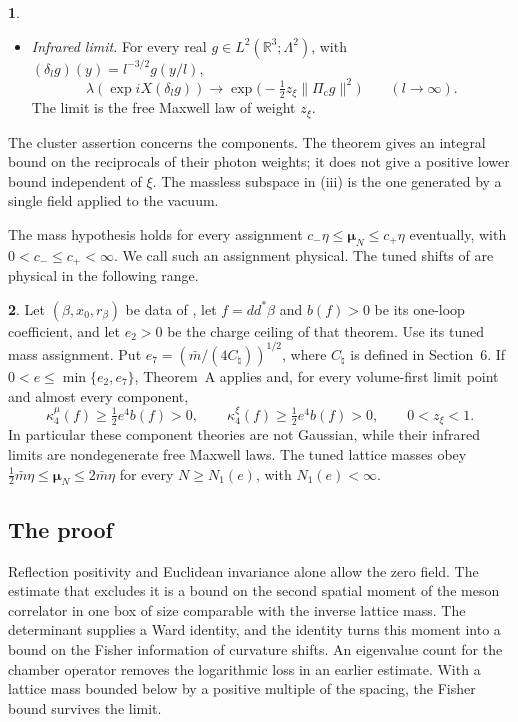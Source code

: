 \documentclass[11pt]{amsart}
\newcommand{\namedhead}{}
\theoremstyle{definition}
\newtheorem*{namedinner}{\namedhead}
\newenvironment{named}[1]{\renewcommand{\namedhead}{#1}\begin{namedinner}}{\end{namedinner}}
\begin{document}
\begin{named}{Theorem A}
\begin{itemize}
\item[(iv)] \emph{Infrared limit.}
For every real $g\in L^2(\mathbb R^3;\Lambda^2)$, with
$(\delta_lg)(y)=l^{-3/2}g(y/l)$,
\[
\lambda(\exp iX(\delta_lg))\longrightarrow
\exp\bigl(-\tfrac12z_\xi\|\Pi_{\mathrm c}g\|^2\bigr)
\qquad(l\to\infty).
\]
The limit is the free Maxwell law of weight $z_\xi$.
\end{itemize}
\end{named}

The cluster assertion concerns the components. The theorem gives an
integral bound on the reciprocals of their photon weights; it does not give a positive
lower bound independent of $\xi$. The massless subspace in (iii) is
the one generated by a single field applied to the vacuum.

The mass hypothesis holds for every assignment
$c_-\eta\le\boldsymbol\mu_N\le c_+\eta$ eventually, with
$0<c_-\le c_+<\infty$. We call such an assignment physical.
The tuned shifts of \cite{QEDIII} are physical in the following range.

\begin{named}{Corollary B}
Let $(\beta,x_0,r_\beta)$ be data of \cite[Theorem~44]{QEDIII},
let $f=dd^*\beta$ and $b(f)>0$ be its one-loop coefficient, and let
$e_2>0$ be the charge ceiling of that theorem. Use its tuned mass
assignment. Put
$e_7=(\bar m/(4C_\natural))^{1/2}$, where $C_\natural$ is defined in
Section~6. If $0<e\le\min\{e_2,e_7\}$, Theorem~A applies and, for
every volume-first limit point and almost every component,
\[
\kappa_4^\mu(f)\ge\tfrac12e^4b(f)>0,
\qquad \kappa_4^\xi(f)\ge\tfrac12e^4b(f)>0,
\qquad 0<z_\xi<1.
\]
In particular these component theories are not Gaussian, while their
infrared limits are nondegenerate free Maxwell laws. The tuned lattice
masses obey
$\frac12\bar m\eta\le\boldsymbol\mu_N\le2\bar m\eta$
for every $N\ge N_1(e)$, with $N_1(e)<\infty$.
\end{named}

\subsection*{The proof}
Reflection positivity and Euclidean invariance alone allow the zero
field. The estimate that excludes it is a bound on the second spatial
moment of the meson correlator in one box of size comparable with the
inverse lattice mass. The determinant supplies a Ward identity, and the
identity turns this moment into a bound on the Fisher information of
curvature shifts. An eigenvalue count for the chamber operator removes
the logarithmic loss in an earlier estimate. With a lattice mass bounded
below by a positive multiple of the spacing, the Fisher bound survives
the limit.
\end{document}
